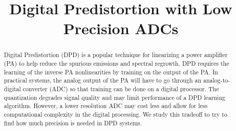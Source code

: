 \documentclass[conference]{IEEEtran}
\begin{document}
%
\title{Digital Predistortion with Low Precision ADCs}




% 
\author{
}




\maketitle

\begin{abstract}
Digital Predistortion (DPD) is a popular technique for linearizing a power amplifier (PA) to help reduce the spurious emissions and spectral regrowth. DPD requires the learning of the inverse PA nonlinearities by training on the output of the PA. In practical systems, the analog output of the PA will have to go through an analog-to-digital converter (ADC) so that training can be done on a digital processor. The quantization degrades signal quality and may limit performance of a DPD learning algorithm. However, a lower resolution ADC may cost less and allow for less computational complexity in the digital processing. We study this tradeoff to try to find how much precision is needed in DPD systems.

\end{abstract}
\end{document}
